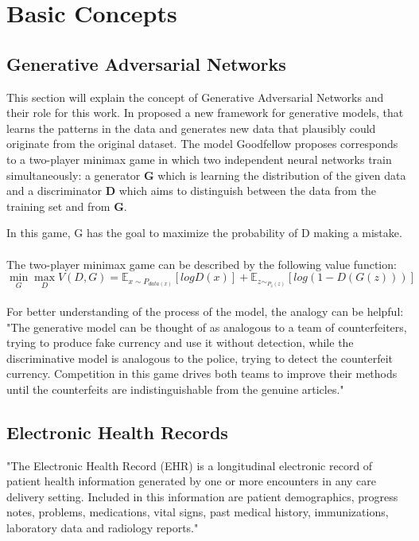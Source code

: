 \documentclass[11pt, a4paper]{book}
\begin{document}
\section{Basic Concepts}
\subsection{Generative Adversarial Networks}
This section will explain the concept of Generative Adversarial Networks and their role for this work.
In \cite{goodfellow2014generative} proposed a new framework for generative models, that learns the patterns in the data and generates new data that plausibly could originate from the original dataset.
 The model Goodfellow proposes corresponds to a two-player minimax game in which two independent neural networks train simultaneously: a generator \textbf{G} which is learning the distribution of the given data and a discriminator \textbf{D} which aims to distinguish between the data from the training set and from \textbf{G}.

In this game, G has the goal to maximize the probability of D making a mistake.  \cite{goodfellow2014generative}
\\
\\
The two-player minimax game can be described by the following value function:
\\
\begin{equation}
	\min_G\max_DV(D,G) = \mathbb{E}_{x\sim{P_{data(x)}}}[log D(x)] + \mathbb{E}_{z\sim_{P_z(z)}}[log(1 - D(G(z)))]
\end{equation}
\cite{Goodfellow2014}
\\

For better understanding of the process of the model, the analogy can be helpful:
"The generative model can be thought of as analogous to a team of counterfeiters, trying  to  produce  fake  currency  and  use  it  without  detection,  while  the  discriminative  model  is analogous to the police, trying to detect the counterfeit currency.  Competition in this game drives both teams to improve their methods until the counterfeits are indistinguishable from the genuine articles." \cite{goodfellow2014generative}

\subsection{Electronic Health Records}
"The Electronic Health Record (EHR) is a longitudinal electronic record of patient health information generated by one or more encounters in any care delivery setting. Included in this information are patient demographics, progress notes, problems, medications, vital signs, past medical history, immunizations, laboratory data and radiology reports." \cite{HIMMS}
\end{document}
